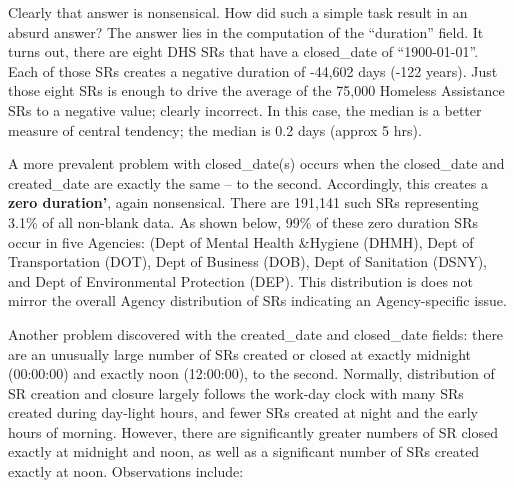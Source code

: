 \documentclass[12pt, titlepage]{article}
\begin{document}
		
Clearly that answer is nonsensical. How did such a simple task result 
in an absurd answer? The answer lies in the computation of the ``duration'' 
field. It turns out, there are eight DHS SRs that have a closed\_date 
of ``1900-01-01''. Each of those SRs creates a negative duration of -44,602 
days (-122 years). Just those eight SRs is enough to drive the 
average of the 75,000 Homeless Assistance SRs to a negative 
value; clearly incorrect. In this case, the median is a better measure 
of central tendency; the median is  0.2 days (approx 5 hrs). 

		
	
		
\label{sec: zeroduration}		
A more prevalent problem with closed\_date(s) occurs when 
the closed\_date and created\_date are exactly the same -- to 
the second. Accordingly, this creates a \textbf{zero duration'}, again 
nonsensical. There are 191,141 such SRs representing 3.1\% of 
all non-blank data. As shown below, 99\% of these zero duration 
SRs occur in five Agencies:  (Dept of Mental Health \&Hygiene (DHMH), Dept 
of Transportation (DOT), Dept of Business (DOB), Dept of Sanitation 
(DSNY), and Dept of Environmental Protection (DEP). This distribution
is does not mirror the overall Agency distribution of SRs indicating an 
Agency-specific issue.
	
		

		
\label{sec:midnightandnoon}
Another problem discovered with the created\_date and 
closed\_date fields: there are an unusually large number of SRs 
created or closed at exactly midnight (00:00:00) and exactly noon (12:00:00), 
to the second. Normally, distribution of SR creation and closure 
largely follows the work-day clock with many SRs created during 
day-light hours, and fewer SRs 	created at night and the early hours 
of morning. However, there are significantly greater numbers 
of SR closed exactly at midnight and noon, as well as a significant 
number of SRs created exactly at noon. Observations include:
\end{document}
